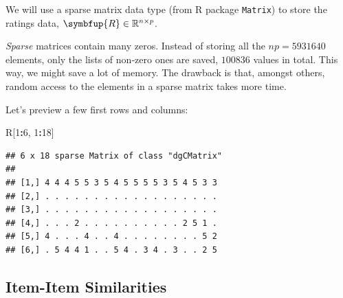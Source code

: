 \documentclass[10pt,b5paper,krantz1]{krantz}
\newenvironment{Shaded}{\begin{snugshade}}{\end{snugshade}}
\newcommand{\CommentTok}[1]{\textcolor[rgb]{0.37,0.37,0.37}{\textit{#1}}}
\newcommand{\DataTypeTok}[1]{\textcolor[rgb]{0.27,0.27,0.27}{#1}}
\newcommand{\DecValTok}[1]{\textcolor[rgb]{0.06,0.06,0.06}{#1}}
\newcommand{\FloatTok}[1]{\textcolor[rgb]{0.06,0.06,0.06}{#1}}
\newcommand{\KeywordTok}[1]{\textcolor[rgb]{0.27,0.27,0.27}{\textbf{#1}}}
\newcommand{\NormalTok}[1]{#1}
\newcommand{\OperatorTok}[1]{\textcolor[rgb]{0.43,0.43,0.43}{\textbf{#1}}}
\newcommand{\OtherTok}[1]{\textcolor[rgb]{0.37,0.37,0.37}{#1}}
\newcommand{\StringTok}[1]{\textcolor[rgb]{0.5,0.5,0.5}{#1}}
\providecommand{\tightlist}{%
  \setlength{\itemsep}{0pt}\setlength{\parskip}{0pt}}
\renewcommand{\mathbf}[1]{\symbfup{#1}}
\begin{document}
We will use a sparse matrix data type (from R package \texttt{Matrix})
to store the ratings data, \(\mathbf{R}\in\mathbb{R}^{n\times p}\).

\begin{description}
\tightlist
\item[Remark.]
\emph{Sparse} matrices contain many zeros. Instead of storing all the
\(np=5931640\) elements, only the lists of non-zero ones are saved,
\(100836\) values in total.
This way, we might save a lot of memory.
The drawback is that, amongst others, random access to the elements
in a sparse matrix takes more time.
\end{description}

\begin{Shaded}
\end{Shaded}

Let's preview a few first rows and columns:

\begin{Shaded}
\begin{Highlighting}[]
\NormalTok{R[}\DecValTok{1}\OperatorTok{:}\DecValTok{6}\NormalTok{, }\DecValTok{1}\OperatorTok{:}\DecValTok{18}\NormalTok{]}
\end{Highlighting}
\end{Shaded}

\begin{verbatim}
## 6 x 18 sparse Matrix of class "dgCMatrix"
##                                         
## [1,] 4 4 4 5 5 3 5 4 5 5 5 5 3 5 4 5 3 3
## [2,] . . . . . . . . . . . . . . . . . .
## [3,] . . . . . . . . . . . . . . . . . .
## [4,] . . . 2 . . . . . . . . . . 2 5 1 .
## [5,] 4 . . . 4 . . 4 . . . . . . . . 5 2
## [6,] . 5 4 4 1 . . 5 4 . 3 4 . 3 . . 2 5
\end{verbatim}

\hypertarget{item-item-similarities}{%
\subsection{Item-Item Similarities}\label{item-item-similarities}}
\end{document}
